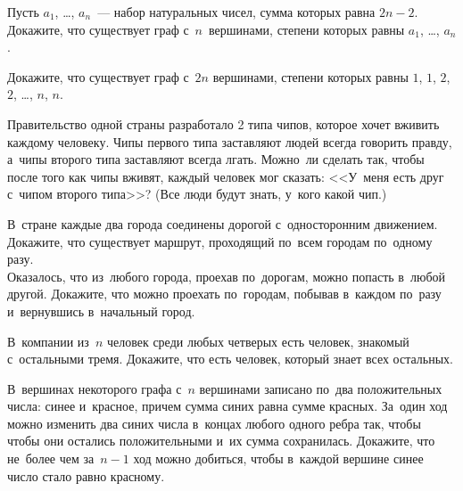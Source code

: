 


\begin{problems}

\item
Пусть $a_{1}$, \ldots, $a_{n}$~--- набор натуральных чисел, сумма которых равна
$2 n - 2$.
Докажите, что существует граф с~$n$~вершинами, степени которых равны
$a_{1}$, \ldots, $a_{n}$.

\item
Докажите, что существует граф с~$2 n$ вершинами, степени которых равны
$1$, $1$, $2$, $2$, \ldots, $n$, $n$.

\item
Правительство одной страны разработало 2 типа чипов, которое хочет вживить
каждому человеку.
Чипы первого типа заставляют людей всегда говорить правду, а~чипы второго типа
заставляют всегда лгать.
Можно~ли сделать так, чтобы после того как чипы вживят, каждый человек мог
сказать:
<<У~меня есть друг с~чипом второго типа>>?
(Все люди будут знать, у~кого какой чип.)

\item
В~стране каждые два города соединены дорогой с~односторонним движением.
\\
\subproblem
Докажите, что существует маршрут, проходящий по~всем городам по~одному разу.
\\
\subproblem
Оказалось, что из~любого города, проехав по~дорогам, можно попасть в~любой
другой.
Докажите, что можно проехать по~городам, побывав в~каждом по~разу и~вернувшись
в~начальный город.

\item
В~компании из~$n$ человек среди любых четверых есть человек, знакомый
с~остальными тремя.
Докажите, что есть человек, который знает всех остальных.

\item
В~вершинах некоторого графа с~$n$ вершинами записано по~два положительных
числа: синее и~красное, причем сумма синих равна сумме красных.
За~один ход можно изменить два синих числа в~концах любого одного
ребра так, чтобы чтобы они остались положительными и~их сумма сохранилась.
Докажите, что не~более чем за~$n-1$ ход можно добиться, чтобы в~каждой вершине
синее число стало равно красному.

\end{problems}


